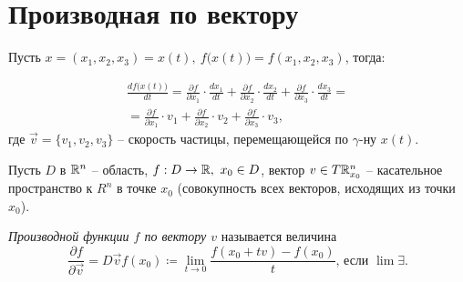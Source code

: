 

\section{Производная по вектору}

\begin{note}
    Пусть $ x = (x_1,x_2,x_3) = x(t), \ f\big(x(t)\big) = f(x_1,x_2,x_3)$, тогда:

    \begin{multline*}
        \frac{df\big(x(t)\big)}{dt} = \frac{\partial f}{\partial x_1} \cdot \frac{dx_1}{dt} + \frac{\partial f}{\partial x_2} \cdot \frac{dx_2}{dt} + \frac{\partial f}{\partial x_3} \cdot \frac{dx_3}{dt} = \\
        = \frac{\partial f}{\partial x_1} \cdot v_1 + \frac{\partial f}{\partial x_2} \cdot v_2 + \frac{\partial f}{\partial x_3} \cdot v_3,
    \end{multline*}
    где $\vec{v} = \{v_1,v_2,v_3\}$ -- скорость частицы, перемещающейся по $\gamma$-ну $x(t)$.
\end{note}

\begin{definition}
    Пусть $ D $ в $ \mathbb{R}^n $ -- область, $ f:D\rightarrow \mathbb{R}, \ x_0 \in D $, вектор $ v\in T\mathbb{R}_{x_0}^n $ -- касательное пространство к $ R^n $ в точке $ x_0 $ (совокупность всех векторов, исходящих из точки $ x_0 $).

    \emph{Производной функции $ f $ по вектору $ v $} называется величина
    \[
        \frac{\partial f}{\partial \vec{v}} = D \vec{v} f(x_0) \coloneqq \underset{t \rightarrow 0}{\lim}\frac{f(x_0 + tv) - f(x_0)}{t}\text{, если }\lim \exists.
    \]
\end{definition}

\newpage

